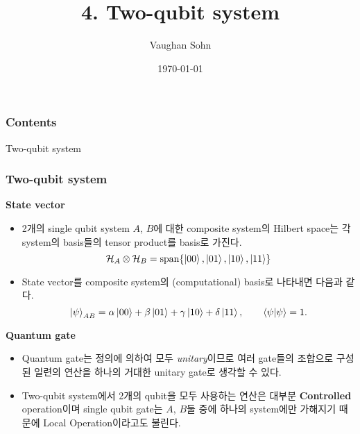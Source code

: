 \documentclass[9pt]{beamer}
\title{4. Two-qubit system}
\date{\today}
\author{Vaughan Sohn}
\begin{document}
    \maketitle
    
    \begin{frame}
        \frametitle{Contents}
        \tableofcontents
    \end{frame}

    \begin{section}{Two-qubit system}
        \begin{frame}
            \frametitle{Two-qubit system}
            \textbf{State vector}
            \begin{itemize}
                \item 2개의 single qubit system $A$, $B$에 대한 composite system의 Hilbert space는 각 system의 basis들의 tensor product를 basis로 가진다. 
                \begin{equation*}
                    \mathcal H_A \otimes \mathcal H_B = \text{span} \{ \ket{00}, \ket{01}, \ket{10}, \ket{11} \}
                \end{equation*}
                \item State vector를 composite system의 (computational) basis로 나타내면 다음과 같다.
                \begin{equation*}
                    \ket{\psi}_{AB} = \alpha \ket{00} + \beta \ket{01} + \gamma \ket{10} + \delta \ket{11}, \qquad \braket{\psi|\psi} = 1.
                \end{equation*}
            \end{itemize}
            \vspace{0.5cm}
            \textbf{Quantum gate}
            \begin{itemize}
                \item Quantum gate는 정의에 의하여 모두 \textit{unitary}이므로 여러 gate들의 조합으로 구성된 일련의 연산을 하나의 거대한 unitary gate로 생각할 수 있다.
                \item Two-qubit system에서 2개의 qubit을 모두 사용하는 연산은 대부분 \textbf{Controlled} operation이며 single qubit gate는 $A$, $B$둘 중에 하나의 system에만 가해지기 때문에 \alert{Local Operation}이라고도 불린다.
            \end{itemize}
        \end{frame}


\end{section}
\end{document}

